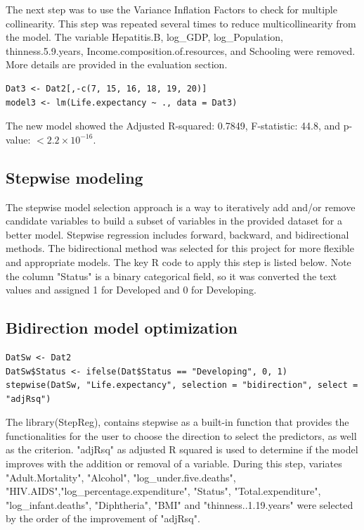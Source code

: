 The next step was to use the Variance Inflation Factors to check for multiple collinearity. This step was repeated several times to reduce multicollinearity from the model. The variable Hepatitis.B, log\_GDP, log\_Population, thinness.5.9.years, Income.composition.of.resources, and Schooling were removed. More details are provided in the evaluation section.


\begin{verbatim}
Dat3 <- Dat2[,-c(7, 15, 16, 18, 19, 20)]
model3 <- lm(Life.expectancy ~ ., data = Dat3)
\end{verbatim}
The new model showed the Adjusted R-squared: 0.7849, F-statistic:  44.8, and p-value: $< 2.2\times 10^{-16}$.


\subsection{Stepwise modeling}

The stepwise model selection approach is a way to iteratively add and/or remove candidate variables to build a subset of variables in the provided dataset for a better model. Stepwise regression includes forward, backward, and bidirectional methods. The bidirectional method was selected for this project for more flexible and appropriate models. The key R code to apply this step is listed below. Note the column "Status" is a binary categorical field, so it was converted the text values and assigned 1 for Developed and 0 for Developing.

\subsection{Bidirection model optimization}

\begin{verbatim}
DatSw <- Dat2
DatSw$Status <- ifelse(Dat$Status == "Developing", 0, 1)
stepwise(DatSw, "Life.expectancy", selection = "bidirection", select = "adjRsq")
\end{verbatim}

The library(StepReg), contains stepwise as a built-in function that provides the functionalities for the user to choose the direction to select the predictors, as well as the criterion. "adjRsq" as adjusted R squared is used to determine if the model improves with the addition or removal of a variable. During this step, variates "Adult.Mortality", "Alcohol", "log\_under.five.deaths", "HIV.AIDS","log\_percentage.expenditure", "Status", "Total.expenditure", "log\_infant.deaths", "Diphtheria", "BMI" and "thinness..1.19.years" were selected by the order of the improvement of "adjRsq".

